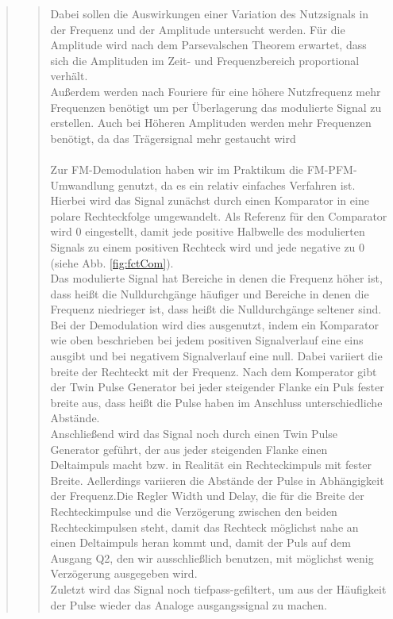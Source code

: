 \begin{quote}
\begin{quote}
        Dabei sollen die Auswirkungen einer Variation des Nutzsignals in der Frequenz und der Amplitude untersucht werden. Für die
        Amplitude wird nach dem Parsevalschen Theorem erwartet, dass sich die Amplituden im Zeit- und Frequenzbereich proportional
        verhält.\\
        Außerdem werden nach Fouriere für eine höhere Nutzfrequenz mehr Frequenzen benötigt um per Überlagerung das modulierte
        Signal zu erstellen. Auch bei Höheren Amplituden werden mehr Frequenzen benötigt, da das Trägersignal mehr gestaucht
        wird\\
        \\
        Zur FM-Demodulation haben wir im Praktikum die FM-PFM-Umwandlung genutzt, da es ein relativ einfaches Verfahren ist.
        Hierbei wird das Signal zunächst durch einen Komparator in eine polare Rechteckfolge umgewandelt.
        Als Referenz für den Comparator wird \si{0}{\volt} eingestellt, damit jede positive Halbwelle des modulierten Signals zu
        einem positiven Rechteck wird und jede negative zu \si{0}{\volt} (siehe Abb.
        \ref{fig:fctCom}).\\
        Das modulierte Signal hat Bereiche in denen die Frequenz höher ist, dass heißt die Nulldurchgänge häufiger und Bereiche in
        denen die Frequenz niedrieger ist, dass heißt die Nulldurchgänge seltener sind. Bei der Demodulation wird dies ausgenutzt,
        indem ein Komparator wie oben beschrieben bei jedem positiven Signalverlauf eine  eins ausgibt und bei negativem
        Signalverlauf eine null. Dabei variiert die breite der Rechteckt mit der Frequenz. Nach dem Komperator gibt der Twin Pulse
        Generator bei jeder steigender Flanke ein Puls fester breite aus, dass heißt die Pulse haben im Anschluss unterschiedliche
        Abstände.\\
        Anschließend wird das Signal noch durch einen Twin Pulse Generator geführt, der aus jeder steigenden Flanke einen
        Deltaimpuls macht bzw. in Realität ein Rechteckimpuls mit fester Breite.
        Aellerdings variieren die Abstände der Pulse in Abhängigkeit der Frequenz.Die Regler Width und Delay, die für die Breite
        der Rechteckimpulse und die Verzögerung zwischen den beiden Rechteckimpulsen steht, damit das Rechteck möglichst nahe an
        einen Deltaimpuls heran kommt und, damit der Puls auf dem Ausgang Q2, den wir ausschließlich benutzen, mit möglichst wenig
        Verzögerung ausgegeben wird.\\
        Zuletzt wird das Signal noch tiefpass-gefiltert, um aus der Häufigkeit der Pulse wieder das Analoge ausgangssignal zu
        machen.
        

\end{quote}
\end{quote}
